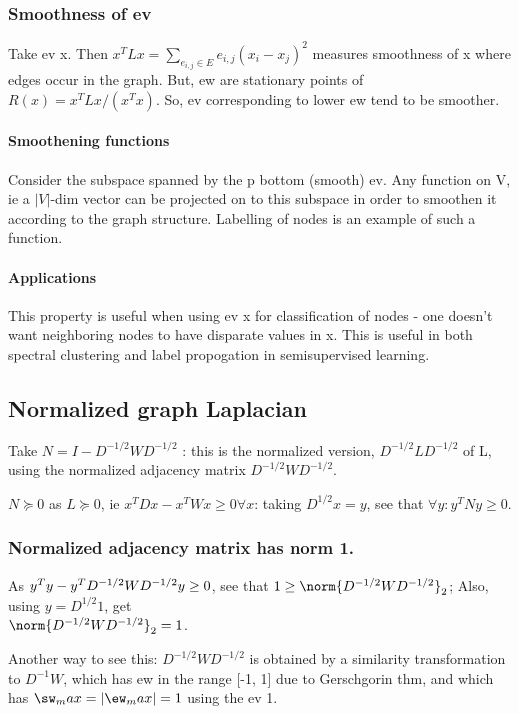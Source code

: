 \documentclass[oneside, article]{memoir}
\begin{document}
\subsubsection{Smoothness of ev}
Take ev x. Then $x^{T}Lx = \sum_{e_{i,j} \in E} e_{i,j} (x_{i} - x_{j})^{2}$ measures smoothness of x where edges occur in the graph. But, ew are stationary points of $R(x) = x^{T}Lx/ (x^{T}x)$. So, ev corresponding to lower ew tend to be smoother.

\paragraph*{Smoothening functions}
Consider the subspace spanned by the p bottom (smooth) ev. Any function on V, ie a $|V|$-dim vector can be projected on to this subspace in order to smoothen it according to the graph structure. Labelling of nodes is an example of such a function.

\paragraph*{Applications}
This property is useful when using ev x for classification of nodes - one doesn't want neighboring nodes to have disparate values in x. This is useful in both spectral clustering and label propogation in semisupervised learning.

\subsection{Normalized graph Laplacian}
Take $N = I-D^{-1/2}WD^{-1/2}$ : this is the normalized version, $D^{-1/2}LD^{-1/2}$ of L, using the normalized adjacency matrix $D^{-1/2}WD^{-1/2}$.

$N \succeq 0$ as $L \succeq 0$, ie $x^{T}Dx-x^{T}Wx \geq 0 \forall x$: taking $D^{1/2}x = y$, see that $\forall y: y^{T}Ny \geq 0$.

\subsubsection{Normalized adjacency matrix has norm 1.}
As $y^{T}y - y^{T}D^{-1/2}WD^{-1/2}y \\
\geq 0$, see that $1 \geq \norm{D^{-1/2}WD^{-1/2}}_2$; Also, using $y = D^{1/2}1$, get \\
$\norm{D^{-1/2}WD^{-1/2}}_2 = 1$.

Another way to see this: $D^{-1/2}WD^{-1/2}$ is obtained by a similarity transformation to $D^{-1}W$, which has ew in the range [-1, 1] due to Gerschgorin thm, and which has $\sw_max = |\ew_max| = 1$ using the ev 1.
\end{document}
